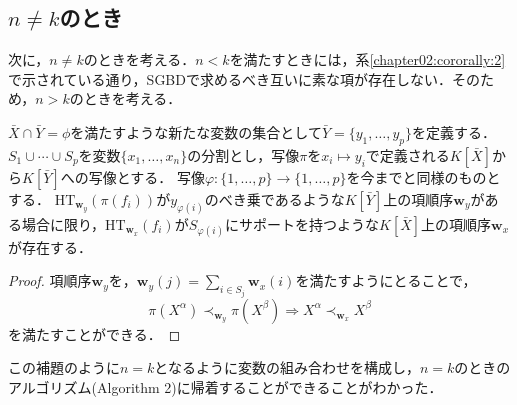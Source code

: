 \subsection{$n \ne k$のとき}
次に，$n \ne k$のときを考える．$n < k$を満たすときには，系\ref{chapter02:cororally:2}で示されている通り，SGBDで求めるべき互いに素な項が存在しない．そのため，$n > k$のときを考える．
\begin{lemma}
	$\bar{X} \cap \bar{Y} = \phi$を満たすような新たな変数の集合として$\bar{Y} = \{y_1, \dots, y_p\}$を定義する．
	$S_1 \cup \cdots \cup S_p$を変数$\{ x_1, \dots, x_n \}$の分割とし，写像$\pi$を$x_i \mapsto y_i$で定義される$K[\bar{X}]$から$K[\bar{Y}]$への写像とする．
写像$\varphi:\{1, \dots, p\} \to \{1, \dots, p\}$を今までと同様のものとする．
$\mathrm{HT}_{\bm{w}_y}(\pi(f_i))$が$y_{\varphi(i)}$のべき乗であるような$K[\bar{Y}]$上の項順序$\bm{w}_y$がある場合に限り，$\mathrm{HT}_{\bm{w}_x}(f_i)$が$S_{\varphi(i)}$にサポートを持つような$K[\bar{X}]$上の項順序$\bm{w}_x$が存在する．
\end{lemma}
\begin{proof}
	項順序$\bm{w}_y$を，$\displaystyle \bm{w}_y(j) = \sum_{i \in S_j}\bm{w}_x(i)$を満たすようにとることで，
	$$\pi(X^\alpha) \prec_{\bm{w}_y} \pi(X^\beta) \Longrightarrow X^\alpha \prec_{\bm{w}_x} X^\beta$$
	を満たすことができる．
\end{proof}
この補題のように$n = k$となるように変数の組み合わせを構成し，$n = k$のときのアルゴリズム(Algorithm 2)に帰着することができることがわかった．



















